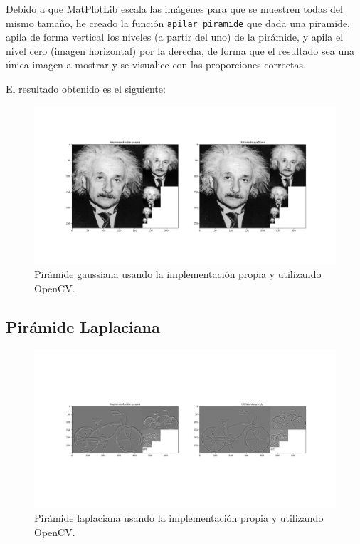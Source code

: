 \documentclass[12pt, spanish]{article}
\begin{document}
Debido a que MatPlotLib escala las imágenes para que se muestren todas del mismo tamaño, he creado la función \texttt{apilar\_piramide} que dada una piramide, apila de forma vertical los niveles (a partir del uno) de la pirámide, y apila el nivel cero (imagen horizontal) por la derecha, de forma que el resultado sea una única imagen a mostrar y se visualice con las proporciones correctas.

El resultado obtenido es el siguiente:


\begin{figure}[H]
  \centering
      \includegraphics[width=\textwidth]{ej2AG.png}
 		 \caption{Pirámide gaussiana usando la implementación propia y utilizando OpenCV.}
  		\label{fig:ej2ag}

\end{figure}


\subsection{Pirámide Laplaciana}


\begin{figure}[H]
  \centering
      \includegraphics[width=\textwidth]{ej2AL.png}
 		 \caption{Pirámide laplaciana usando la implementación propia y utilizando OpenCV.}
  		\label{fig:ej2al}

\end{figure}
\end{document}

